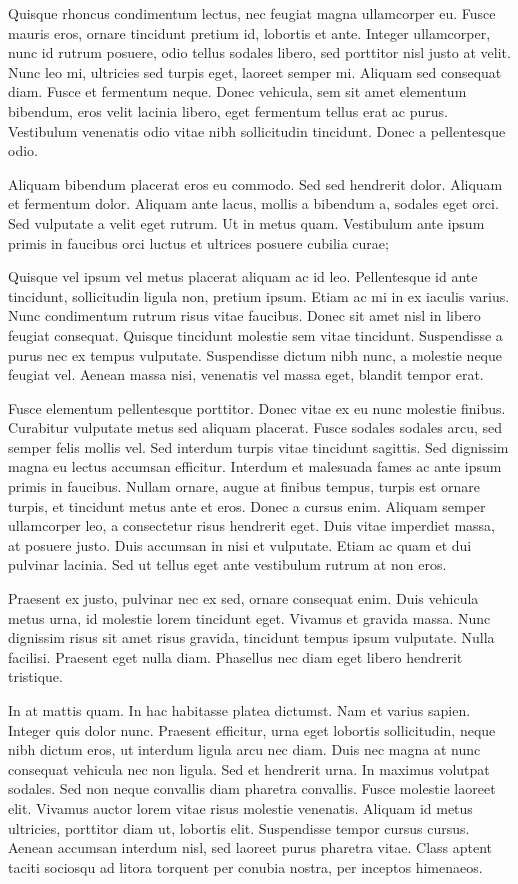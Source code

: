 Quisque rhoncus condimentum lectus, nec feugiat magna ullamcorper eu. Fusce mauris eros, ornare tincidunt pretium id, lobortis et ante. Integer ullamcorper, nunc id rutrum posuere, odio tellus sodales libero, sed porttitor nisl justo at velit. Nunc leo mi, ultricies sed turpis eget, laoreet semper mi. Aliquam sed consequat diam. Fusce et fermentum neque. Donec vehicula, sem sit amet elementum bibendum, eros velit lacinia libero, eget fermentum tellus erat ac purus. Vestibulum venenatis odio vitae nibh sollicitudin tincidunt. Donec a pellentesque odio.

Aliquam bibendum placerat eros eu commodo. Sed sed hendrerit dolor. Aliquam et fermentum dolor. Aliquam ante lacus, mollis a bibendum a, sodales eget orci. Sed vulputate a velit eget rutrum. Ut in metus quam. Vestibulum ante ipsum primis in faucibus orci luctus et ultrices posuere cubilia curae;

Quisque vel ipsum vel metus placerat aliquam ac id leo. Pellentesque id ante tincidunt, sollicitudin ligula non, pretium ipsum. Etiam ac mi in ex iaculis varius. Nunc condimentum rutrum risus vitae faucibus. Donec sit amet nisl in libero feugiat consequat. Quisque tincidunt molestie sem vitae tincidunt. Suspendisse a purus nec ex tempus vulputate. Suspendisse dictum nibh nunc, a molestie neque feugiat vel. Aenean massa nisi, venenatis vel massa eget, blandit tempor erat.

Fusce elementum pellentesque porttitor. Donec vitae ex eu nunc molestie finibus. Curabitur vulputate metus sed aliquam placerat. Fusce sodales sodales arcu, sed semper felis mollis vel. Sed interdum turpis vitae tincidunt sagittis. Sed dignissim magna eu lectus accumsan efficitur. Interdum et malesuada fames ac ante ipsum primis in faucibus. Nullam ornare, augue at finibus tempus, turpis est ornare turpis, et tincidunt metus ante et eros. Donec a cursus enim. Aliquam semper ullamcorper leo, a consectetur risus hendrerit eget. Duis vitae imperdiet massa, at posuere justo. Duis accumsan in nisi et vulputate. Etiam ac quam et dui pulvinar lacinia. Sed ut tellus eget ante vestibulum rutrum at non eros.

Praesent ex justo, pulvinar nec ex sed, ornare consequat enim. Duis vehicula metus urna, id molestie lorem tincidunt eget. Vivamus et gravida massa. Nunc dignissim risus sit amet risus gravida, tincidunt tempus ipsum vulputate. Nulla facilisi. Praesent eget nulla diam. Phasellus nec diam eget libero hendrerit tristique.

In at mattis quam. In hac habitasse platea dictumst. Nam et varius sapien. Integer quis dolor nunc. Praesent efficitur, urna eget lobortis sollicitudin, neque nibh dictum eros, ut interdum ligula arcu nec diam. Duis nec magna at nunc consequat vehicula nec non ligula. Sed et hendrerit urna. In maximus volutpat sodales. Sed non neque convallis diam pharetra convallis. Fusce molestie laoreet elit. Vivamus auctor lorem vitae risus molestie venenatis. Aliquam id metus ultricies, porttitor diam ut, lobortis elit. Suspendisse tempor cursus cursus. Aenean accumsan interdum nisl, sed laoreet purus pharetra vitae. Class aptent taciti sociosqu ad litora torquent per conubia nostra, per inceptos himenaeos.

